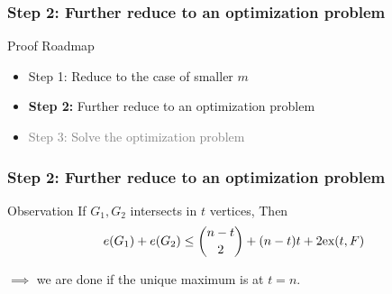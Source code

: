 \documentclass{beamer}
\newcommand*{\ex}{\textnormal{ex}}
\begin{document}


  



\begin{frame}
  \frametitle{Step 2: Further reduce to an optimization problem}

  Proof Roadmap

  \begin{itemize}
    \item Step 1: Reduce to the case of smaller $m$
    \item \textbf{Step 2:} Further reduce to an optimization problem
    \item \textcolor{gray}{Step 3: Solve the optimization problem}
  \end{itemize}
\end{frame}

\begin{frame}
  \frametitle{Step 2: Further reduce to an optimization problem}

  \begin{center}
  \end{center}

  \pause

  \begin{block}{Observation}
    If $G_1, G_2$ intersects in $t$ vertices, Then
    \[
      e(G_1) + e(G_2) \leq \binom{n - t}{2} + (n - t)t + 2\ex(t, F)
    \]
  \end{block}

  \pause

  \vspace{0.3cm}

  $\implies$ we are done if the unique maximum is at $t = n$.
\end{frame}
\end{document}
